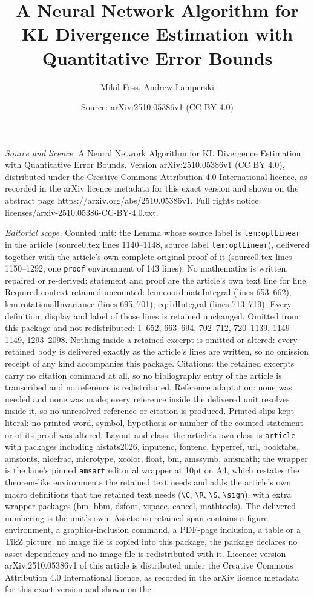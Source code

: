 \documentclass[10pt,a4paper]{amsart}
\title[A Neural Network Algorithm for KL Divergence Estimation with]{A Neural Network Algorithm for KL Divergence Estimation with Quantitative Error Bounds}
\author{Mikil Foss, Andrew Lamperski}
\date{Source: arXiv:2510.05386v1 (CC BY 4.0)}
\begin{document}
\maketitle

\noindent\emph{Source and licence.} A Neural Network Algorithm for KL Divergence Estimation with Quantitative Error Bounds. Version arXiv:2510.05386v1 (CC BY 4.0), distributed under the Creative Commons Attribution 4.0 International licence, as recorded in the arXiv licence metadata for this exact version and shown on the abstract page https://arxiv.org/abs/2510.05386v1. Full rights notice: licenses/arxiv-2510.05386-CC-BY-4.0.txt.\par\smallskip

\noindent\textit{Editorial scope.} Counted unit: the Lemma whose source label is \texttt{lem:optLinear} in the article (source0.tex lines 1140--1148, source label \texttt{lem:optLinear}), delivered together with the article's own complete original proof of it (source0.tex lines 1150--1292, one \texttt{proof} environment of 143 lines). No mathematics is written, repaired or re-derived: statement and proof are the article's own text line for line. Required context retained uncounted: lem:coordinateIntegral (lines 653--662); lem:rotationalInvariance (lines 695--701); eq:1dIntegral (lines 713--719). Every definition, display and label of those lines is retained unchanged. Omitted from this package and not redistributed: 1--652, 663--694, 702--712, 720--1139, 1149--1149, 1293--2098. Nothing inside a retained excerpt is omitted or altered: every retained body is delivered exactly as the article's lines are written, so no omission receipt of any kind accompanies this package. Citations: the retained excerpts carry no citation command at all, so no bibliography entry of the article is transcribed and no reference is redistributed. Reference adaptation: none was needed and none was made; every reference inside the delivered unit resolves inside it, so no unresolved reference or citation is produced. Printed slips kept literal: no printed word, symbol, hypothesis or number of the counted statement or of its proof was altered. Layout and class: the article's own class is \texttt{article} with packages including aistats2026, inputenc, fontenc, hyperref, url, booktabs, amsfonts, nicefrac, microtype, xcolor, float, bm, amssymb, amsmath; the wrapper is the lane's pinned \texttt{amsart} editorial wrapper at 10pt on A4, which restates the theorem-like environments the retained text needs and adds the article's own macro definitions that the retained text needs (\texttt{\textbackslash C}, \texttt{\textbackslash R}, \texttt{\textbackslash S}, \texttt{\textbackslash sign}), with extra wrapper packages (bm, bbm, dsfont, xspace, cancel, mathtools). The delivered numbering is the unit's own. Assets: no retained span contains a figure environment, a graphics-inclusion command, a PDF-page inclusion, a table or a TikZ picture; no image file is copied into this package, the package declares no asset dependency and no image file is redistributed with it. Licence: version arXiv:2510.05386v1 of this article is distributed under the Creative Commons Attribution 4.0 International licence, as recorded in the arXiv licence metadata for this exact version and shown on the 
\end{document}
